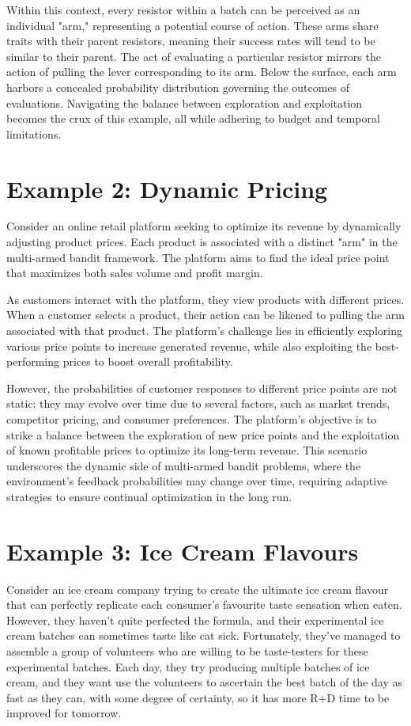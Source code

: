 Within this context, every resistor within a batch can be perceived as an individual "arm," representing a potential course of action. These arms share traits with their parent resistors, meaning their success rates will tend to be similar to their parent. The act of evaluating a particular resistor mirrors the action of pulling the lever corresponding to its arm. Below the surface, each arm harbors a concealed probability distribution governing the outcomes of evaluations. Navigating the balance between exploration and exploitation becomes the crux of this example, all while adhering to budget and temporal limitations.


\section*{Example 2: Dynamic Pricing}
\label{ex:dynamic-pricing}

Consider an online retail platform seeking to optimize its revenue by dynamically adjusting product prices. Each product is associated with a distinct "arm" in the multi-armed bandit framework. The platform aims to find the ideal price point that maximizes both sales volume and profit margin.

As customers interact with the platform, they view products with different prices. When a customer selects a product, their action can be likened to pulling the arm associated with that product. The platform's challenge lies in efficiently exploring various price points to increase generated revenue, while also exploiting the best-performing prices to boost overall profitability.

However, the probabilities of customer responses to different price points are not static: they may evolve over time due to several factors, such as market trends, competitor pricing, and consumer preferences. The platform's objective is to strike a balance between the exploration of new price points and the exploitation of known profitable prices to optimize its long-term revenue. This scenario underscores the dynamic side of multi-armed bandit problems, where the environment's feedback probabilities may change over time, requiring adaptive strategies to ensure continual optimization in the long run.


\section*{Example 3: Ice Cream Flavours}
\label{ex:ice-cream}
Consider an ice cream company trying to create the ultimate ice cream flavour that can perfectly replicate each consumer's favourite taste sensation when eaten. However, they haven't quite perfected the formula, and their experimental ice cream batches can sometimes taste like cat sick. Fortunately, they've managed to assemble a group of volunteers who are willing to be taste-testers for these experimental batches. Each day, they try producing multiple batches of ice cream, and they want use the volunteers to ascertain the best batch of the day as fast as they can, with some degree of certainty, so it has more R+D time to be improved for tomorrow.

